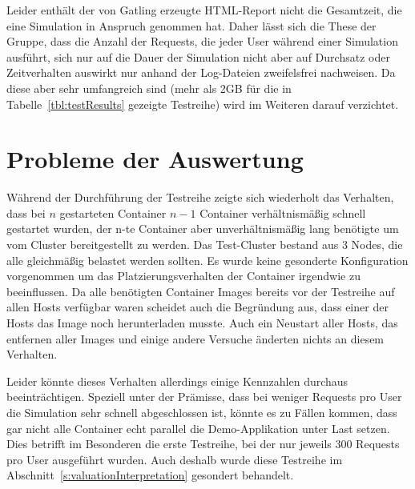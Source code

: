 Leider enth\"alt der von Gatling erzeugte HTML-Report nicht die Gesamtzeit, die eine Simulation in Anspruch genommen hat.
Daher l\"asst sich die These der Gruppe, dass die Anzahl der Requests, die jeder User w\"ahrend einer Simulation ausf\"uhrt, sich nur auf die Dauer der Simulation nicht aber auf Durchsatz oder Zeitverhalten auswirkt nur anhand der Log-Dateien zweifelsfrei nachweisen.
Da diese aber sehr umfangreich sind (mehr als 2GB f\"ur die in Tabelle~\ref{tbl:testResults} gezeigte Testreihe) wird im Weiteren darauf verzichtet.

\section{Probleme der Auswertung}
\label{s:valuationProblems}

W\"ahrend der Durchf\"uhrung der Testreihe zeigte sich wiederholt das Verhalten, dass bei $n$ gestarteten Container $n-1$ Container verh\"altnism\"a\ss{}ig schnell gestartet wurden, der n-te Container aber unverh\"altnism\"a\ss{}ig lang ben\"otigte um vom Cluster bereitgestellt zu werden.
Das Test-Cluster bestand aus 3 Nodes, die alle gleichm\"a\ss{}ig belastet werden sollten.
Es wurde keine gesonderte Konfiguration vorgenommen um das Platzierungsverhalten der Container irgendwie zu beeinflussen.
Da alle ben\"otigten Container Images bereits vor der Testreihe auf allen Hosts verf\"ugbar waren scheidet auch die Begr\"undung aus, dass einer der Hosts das Image noch herunterladen musste.
Auch ein Neustart aller Hosts, das entfernen aller Images und einige andere Versuche \"anderten nichts an diesem Verhalten.

Leider k\"onnte dieses Verhalten allerdings einige Kennzahlen durchaus beeintr\"achtigen.
Speziell unter der Pr\"amisse, dass bei weniger Requests pro User die Simulation sehr schnell abgeschlossen ist, k\"onnte es zu F\"allen kommen, dass gar nicht alle Container echt parallel die Demo-Applikation unter Last setzen.
Dies betrifft im Besonderen die erste Testreihe, bei der nur jeweils 300 Requests pro User ausgef\"uhrt wurden.
Auch deshalb wurde diese Testreihe im Abschnitt~\ref{s:valuationInterpretation} gesondert behandelt.


